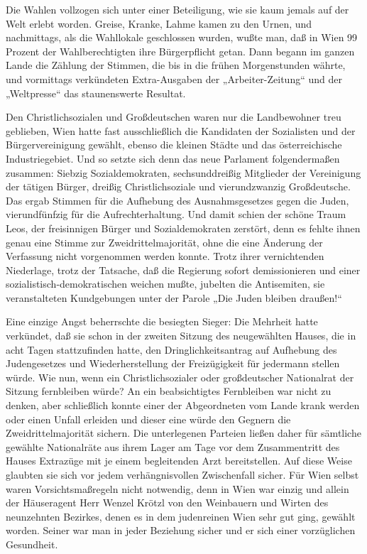 \tb{* * *}
Die Wahlen vollzogen sich unter einer Beteiligung, wie sie kaum
jemals auf der Welt erlebt worden. Greise, Kranke, Lahme kamen zu
den Urnen, und nachmittags, als die Wahllokale geschlossen wurden,
wußte man, daß in Wien 99 Prozent der Wahlberechtigten ihre
Bürgerpflicht getan. Dann begann im ganzen Lande die Zählung der
Stimmen, die bis in die frühen Morgenstunden währte, und vormittags
verkündeten Extra-Ausgaben der „Arbeiter-Zeitung“ und der
„Weltpresse“ das staunenswerte Resultat.

Den Christlichsozialen und Großdeutschen waren nur die Landbewohner
treu geblieben, Wien hatte fast ausschließlich die Kandidaten der
Sozialisten und der Bürgervereinigung gewählt, ebenso die kleinen
Städte und das österreichische Industriegebiet. Und so setzte sich
denn das neue Parlament folgendermaßen zusammen: Siebzig
Sozialdemokraten, sechsunddreißig Mitglieder der Vereinigung der
tätigen Bürger, dreißig Christlichsoziale und vierundzwanzig
Großdeutsche. Das ergab  Stimmen für die
Aufhebung des Ausnahmsgesetzes gegen die Juden, vierundfünfzig für
die Aufrechterhaltung. Und damit schien der schöne Traum Leos, der
freisinnigen Bürger und Sozialdemokraten zerstört, denn es fehlte
ihnen genau eine Stimme zur Zweidrittelmajorität, ohne die eine
Änderung der Verfassung nicht vorgenommen werden konnte. Trotz
ihrer vernichtenden Niederlage, trotz der Tatsache,  daß die Regierung sofort demissionieren und einer
sozialistisch-demokratischen weichen mußte, jubelten die
Antisemiten, sie veranstalteten Kundgebungen unter der Parole „Die
Juden bleiben draußen!“

Eine einzige Angst beherrschte die besiegten Sieger: Die Mehrheit
hatte verkündet, daß sie schon in der zweiten Sitzung des
neugewählten Hauses, die in acht Tagen stattzufinden hatte, den
Dringlichkeitsantrag auf Aufhebung des Judengesetzes und
Wiederherstellung der Freizügigkeit für jedermann stellen würde.
Wie nun, wenn ein Christlichsozialer oder großdeutscher Nationalrat
der Sitzung fernbleiben würde? An ein beabsichtigtes Fernbleiben
war nicht zu denken, aber schließlich konnte einer der Abgeordneten
vom Lande krank werden oder einen Unfall erleiden und dieser eine
würde den Gegnern die Zweidrittelmajorität sichern. Die
unterlegenen Parteien ließen daher für sämtliche gewählte
Nationalräte aus ihrem Lager am Tage vor dem Zusammentritt des
Hauses Extrazüge mit je einem begleitenden Arzt bereitstellen. Auf
diese Weise glaubten sie sich vor jedem verhängnisvollen
Zwischenfall sicher. Für Wien selbst waren Vorsichtsmaßregeln nicht
notwendig, denn in Wien war einzig und allein der Häuseragent Herr
Wenzel Krötzl von den Weinbauern und Wirten des neunzehnten
Bezirkes, denen es in dem judenreinen Wien sehr gut ging, gewählt
worden. Seiner war man in jeder Beziehung sicher und er
 sich einer vorzüglichen Gesundheit.

